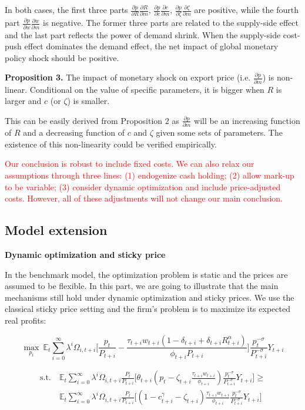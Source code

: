 In both cases, the first three parts $\frac{\partial p}{\partial R}\frac{\partial R}{\partial m}$, $\frac{\partial p}{\partial c}\frac{\partial c}{\partial m}$, $\frac{\partial p}{\partial \zeta}\frac{\partial \zeta}{\partial m}$ are positive, while the fourth part $\frac{\partial p}{\partial w}\frac{\partial w}{\partial m} $ is negative. The former three parts are related to the supply-side effect and the last part reflects the power of demand shrink. When the supply-side cost-push effect dominates the demand effect, the net impact of global monetary policy shock should be positive. 

\textbf{Proposition 3.} The impact of monetary shock on export price (i.e. $\frac{\partial p}{\partial m}$) is non-linear. Conditional on the value of specific parameters, it is bigger when $R$ is larger and $c$ (or $\zeta$) is smaller.

This can be easily derived from Proposition 2 as $\frac{\partial p}{\partial m}$ will be an increasing function of $R$ and a decreasing function of $c$ and $\zeta$ given some sets of parameters. The existence of this non-linearity could be verified empirically.


\textcolor{red}{Our conclusion is robust to include fixed costs. We can also relax our assumptions through three lines: (1) endogenize cash holding; (2) allow mark-up to be variable; (3) consider dynamic optimization and include price-adjusted costs. However, all of these adjustments will not change our main conclusion.} 

\subsection{Model extension}

\textbf{Dynamic optimization and sticky price}

In the benchmark model, the optimization problem is static and the prices are assumed to be flexible. In this part, we are going to illustrate that the main mechanisms still hold under dynamic optimization and sticky prices. We use the classical \cite{calvo1983staggered} sticky price setting and the firm's problem is to maximize its expected real profits:

$$
\max_{p_t} \ \mathbb{E}_t \sum_{i=0}^{\infty} \lambda^i \Omega_{i,t+i} \biggr[ \frac{p_t}{P_{t+i}}-\frac{\tau_{t+i} w_{t+i}(1-\delta_{t+i}+\delta_{t+i} R_{t+i}^\alpha)}{\phi_{t+i}P_{t+i}} \biggr] \frac{p_t^{-\sigma}}{P_{t+i}^{-\sigma}}Y_{t+i}
$$

\begin{align*}
\text{s.t.} \ &\mathbb{E}_t \sum_{i=0}^{\infty} \lambda^i \Omega_{i,t+i} \frac{P_t}{P_{t+i}} \biggr[ \theta_{t+i} (p_t-\zeta_{t+i} \frac{\tau_{t+i} w_{t+i}}{\phi_{t+i}}) \frac{p_t^{-\sigma}}{P_{t+i}^{-\sigma}}Y_{t+i} \biggr] \geq  \\
 &\mathbb{E}_t \sum_{i=0}^{\infty} \lambda^i \Omega_{i,t+i} \frac{P_t}{P_{t+i}} \biggr[(1-c_{t+i}^{\gamma}-\zeta_{t+i}) \frac{\tau_{t+i} w_{t+i}}{\phi_{t+i}} \frac{p_t^{-\sigma}}{P_{t+i}^{-\sigma}}Y_{t+i}\biggr]    
\end{align*}

